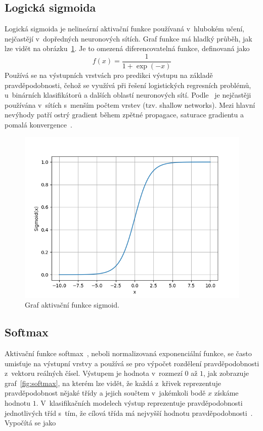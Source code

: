 \subsection*{Logická sigmoida}
Logická sigmoida je nelineární aktivační funkce používaná v~hlubokém učení, nejčastějí v~dopředných neuronových sítích. Graf funkce má hladký průběh, jak lze vidět na obrázku~\ref{fig:sigmoid}. Je to omezená diferencovatelná funkce, definovaná jako
\begin{equation}
  f(x) = \frac{1}{1+\exp(-x)}
\end{equation}
Používá se na výstupních vrstvách pro predikci výstupu na základě pravděpodobnosti, čehož se využívá při řešení logistických regresních problémů, u~binárních klasifikátorů a dalších oblastí neuronových sítí. Podle~\cite{NEAL199271} je nejčastěji používána v~sítích s~menším počtem vrstev (tzv. shallow networks). Mezi hlavní nevýhody patří ostrý gradient během zpětné propagace, saturace gradientu a pomalá konvergence~\cite{nwankpa2018activation}.

\begin{figure}[H]
    \centering
    \includegraphics[scale=0.75]{obrazky-figures/sigmoid.png}
    \caption{\label{fig:sigmoid}Graf aktivační funkce sigmoid.}
\end{figure}



\subsection*{Softmax}
Aktivační funkce softmax~\cite{mitdeeplearning}, neboli normalizovaná exponenciální funkce, se často umisťuje na výstupní vrstvy a používá se pro výpočet rozdělení pravděpodobnosti z~vektoru reálných čísel. Výstupem je hodnota v~rozmezí $0$ až $1$, jak zobrazuje graf~\ref{fig:softmax}, na kterém lze vidět, že každá z~křivek reprezentuje pravděpodobnost nějaké třídy a jejich součtem v~jakémkoli bodě $x$ získáme hodnotu $1$. V~klasifikačních modelech výstup reprezentuje pravděpodobnosti jednotlivých tříd s~tím, že cílová třída má nejvyšší hodnotu pravděpodobnosti~\cite{nwankpa2018activation}. Vypočítá se jako

